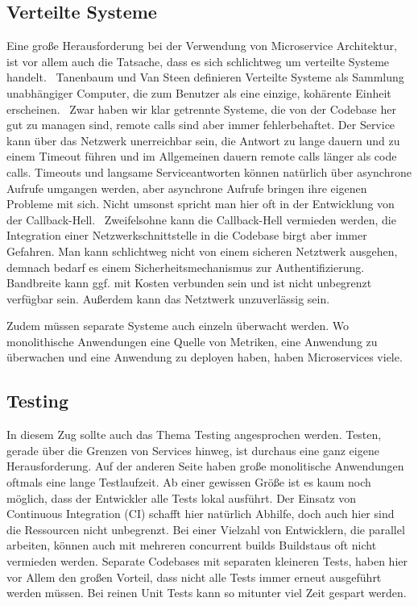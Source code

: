 \subsection{Verteilte Systeme}
Eine große Herausforderung bei der Verwendung von Microservice Architektur, ist vor allem auch die Tatsache, dass es sich schlichtweg um verteilte Systeme handelt.~\cite[][]{microtradeoffs}
Tanenbaum und Van Steen definieren Verteilte Systeme als Sammlung unabhängiger Computer, die zum Benutzer als eine einzige, kohärente Einheit erscheinen.~\cite[][Seite 2]{tanenbaum2002distributed}
Zwar haben wir klar getrennte Systeme, die von der Codebase her gut zu managen sind, remote calls sind aber immer fehlerbehaftet. Der Service kann über das Netzwerk unerreichbar sein, die Antwort zu lange dauern und zu einem Timeout führen und im Allgemeinen dauern remote calls länger als code calls. Timeouts und langsame Serviceantworten können natürlich über asynchrone Aufrufe umgangen werden, aber asynchrone Aufrufe bringen ihre eigenen Probleme mit sich. Nicht umsonst spricht man hier oft in der Entwicklung von der Callback-Hell.~\cite[vgl.][]{callbackhell} Zweifelsohne kann die Callback-Hell vermieden werden, die Integration einer Netzwerkschnittstelle in die Codebase birgt aber immer Gefahren. Man kann schlichtweg nicht von einem sicheren Netztwerk ausgehen, demnach bedarf es einem Sicherheitsmechanismus zur Authentifizierung. Bandbreite kann ggf. mit Kosten verbunden sein und ist nicht unbegrenzt verfügbar sein. Außerdem kann das Netztwerk unzuverlässig sein.~\cite[vgl.][]{distributedfallacies}

Zudem müssen separate Systeme auch einzeln überwacht werden. Wo monolithische Anwendungen eine Quelle von Metriken, eine Anwendung zu überwachen und eine Anwendung zu deployen haben, haben Microservices viele.~\cite[vgl.][]{Heroku:GoMicro}

\subsection{Testing}
\label{section:testing}
In diesem Zug sollte auch das Thema Testing angesprochen werden. Testen, gerade über die Grenzen von Services hinweg, ist durchaus eine ganz eigene Herausforderung. Auf der anderen Seite haben große monolitische Anwendungen oftmals eine lange Testlaufzeit. Ab einer gewissen Größe ist es kaum noch möglich, dass der Entwickler alle Tests lokal ausführt. Der Einsatz von Continuous Integration (CI) schafft hier natürlich Abhilfe, doch auch hier sind die Ressourcen nicht unbegrenzt. Bei einer Vielzahl von Entwicklern, die parallel arbeiten, können auch mit mehreren concurrent builds Buildstaus oft nicht vermieden werden. Separate Codebases mit separaten kleineren Tests, haben hier vor Allem den großen Vorteil, dass nicht alle Tests immer erneut ausgeführt werden müssen. Bei reinen Unit Tests kann so mitunter viel Zeit gespart werden.

